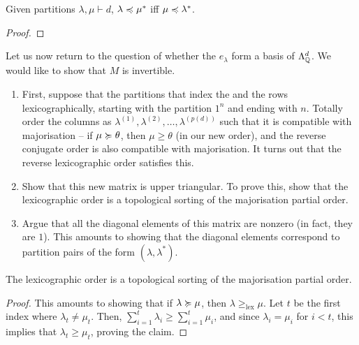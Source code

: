 	\begin{prop}
		Given partitions $\lambda,\mu \vdash d$, $\lambda \preccurlyeq \mu^*$ iff $\mu \preccurlyeq \lambda^*$.
	\end{prop}
	\begin{proof}
	\end{proof}
	
	Let us now return to the question of whether the $e_\lambda$ form a basis of $\Lambda_{\mathbb{Q}}^d$. We would like to show that $M$ is invertible.

	\begin{enumerate}
		\item First, suppose that the partitions that index the and the rows lexicographically, starting with the partition $1^n$ and ending with $n$. Totally order the columns as $\lambda^{(1)},\lambda^{(2)},\ldots,\lambda^{(p(d))}$ such that it is compatible with majorisation -- if $\mu \succcurlyeq \theta$, then $\mu \ge \theta$ (in our new order), and the reverse conjugate order is also compatible with majorisation. It turns out that the reverse lexicographic order satisfies this. 
		\item Show that this new matrix is upper triangular. To prove this, show that the lexicographic order is a topological sorting of the majorisation partial order.
		\item Argue that all the diagonal elements of this matrix are nonzero (in fact, they are $1$). This amounts to showing that the diagonal elements correspond to partition pairs of the form $(\lambda,\lambda^*)$.
	\end{enumerate}

	\begin{prop}
		\label{lem: invertible M 2}
		The lexicographic order is a topological sorting of the majorisation partial order.
	\end{prop}
	\begin{proof}
		This amounts to showing that if $\lambda \succcurlyeq \mu$, then $\lambda \ge_{\text{lex}} \mu$. Let $t$ be the first index where $\lambda_t \ne \mu_t$. Then, $\sum_{i=1}^t \lambda_i \ge \sum_{i=1}^t \mu_i$, and since $\lambda_i = \mu_i$ for $i < t$, this implies that $\lambda_t \ge \mu_t$, proving the claim. 
	\end{proof}

